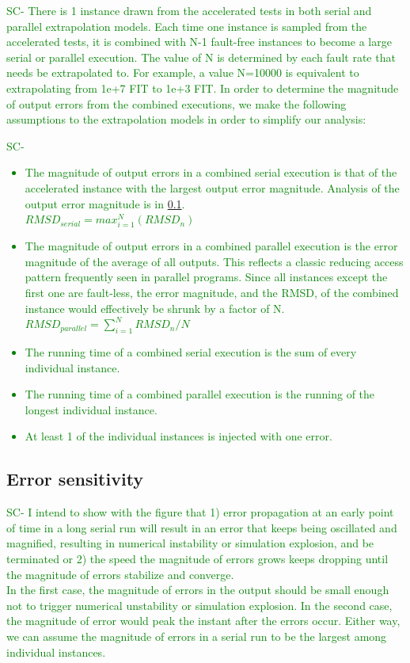 \documentclass{sig-alternate}
\newcommand{\sui}[1]{%
  \textcolor{green}{SC-#1}
}
\begin{document}
{\sui{
There is 1 instance drawn from the accelerated tests in both serial and parallel extrapolation models. Each time one instance is sampled
from the accelerated tests, it is combined with N-1 fault-free instances to become a large serial or parallel execution. The value of N is determined
by each fault rate that needs be extrapolated to. For example, a value N=10000 is equivalent to extrapolating from 1e+7 FIT to 1e+3 FIT.
In order to determine the magnitude of output errors from the combined executions, we make the following assumptions to the extrapolation models
in order to simplify our analysis:
}

\sui{
\begin{itemize}
\item{
The magnitude of output errors in a combined serial execution is that of the accelerated instance with the largest output error magnitude.
Analysis of the output error magnitude is in \ref{sec:eval:errorsensitivity}.\\
$RMSD_{serial} = max_{i=1}^{N} (RMSD_n)$}
\item{The magnitude of output errors in a combined parallel execution is the error magnitude of the average of all outputs.
This reflects a classic reducing access pattern frequently seen in parallel programs. Since all instances except the first one
are fault-less, the error magnitude, and the RMSD, of the combined instance would effectively be shrunk by a factor of N.\\
$RMSD_{parallel} = \sum_{i=1}^{N}{RMSD_n}/N$
}
\item{The running time of a combined serial execution is the sum of every individual instance.}
\item{The running time of a combined parallel execution is the running of the longest individual instance. }
\item{At least 1 of the individual instances is injected with one error.}
\end{itemize}
}

\subsection{Error sensitivity}
\label{sec:eval:errorsensitivity}
\sui{
	I intend to show with the figure that 1) error propagation at an early point of time in a long serial run will result in an error that keeps being oscillated and magnified, resulting in numerical instability or simulation explosion,
	and be terminated or 2) the speed the magnitude of errors grows keeps dropping until the magnitude of errors stabilize and converge. \\
	In the first case, the magnitude of errors in the output should be small enough not to trigger numerical unstability or simulation explosion. In the second case,
	the magnitude of error would peak the instant after the errors occur. Either way, we can assume the magnitude of errors in a serial run to be the largest among
	individual instances.
}

}
\end{document}
